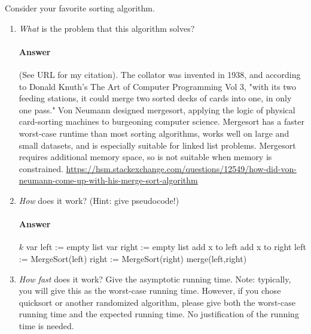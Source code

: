 \documentclass{article}
\begin{document}
Consider your favorite sorting algorithm.
\begin{enumerate}
    \item \emph{What} is the problem that this algorithm solves?

        \paragraph{Answer}{(See URL for my citation). The collator was invented in 1938, and according to Donald Knuth's The Art of Computer Programming Vol 3, "with its two feeding stations, it could merge two sorted decks of cards into one, in only one pass." Von Neumann designed mergesort, applying the logic of physical card-sorting machines to burgeoning computer science. Mergesort has a faster worst-case runtime than most sorting algorithms, works well on large and small datasets, and is especially suitable for linked list problems. Mergesort requires additional memory space, so is not suitable when memory is constrained.}
\url{https://hsm.stackexchange.com/questions/12549/how-did-von-neumann-come-up-with-his-merge-sort-algorithm}

    \item \emph{How} does it work? (Hint: give pseudocode!)

        \paragraph{Answer}
        \begin{algorithmic}
	 
	    \State \Return $k$
	\EndIf
	\State var left := empty list
	\State var right := empty list
	\State add x to left
	\Else
	\State add x to right
	\EndIf
	\EndFor
	\State left := MergeSort(left)
	\State right := MergeSort(right)
	\State \Return merge(left,right)
	\EndFunction
	\end{algorithmic}

    \item \emph{How fast} does it work?  Give the asymptotic running time.
        Note: typically, you will give this as the worst-case running time.
        However, if you chose quicksort or another randomized algorithm, please
        give both the worst-case running time and the expected running time.  No
        justification of the running time is needed.


\end{enumerate}
\end{document}
